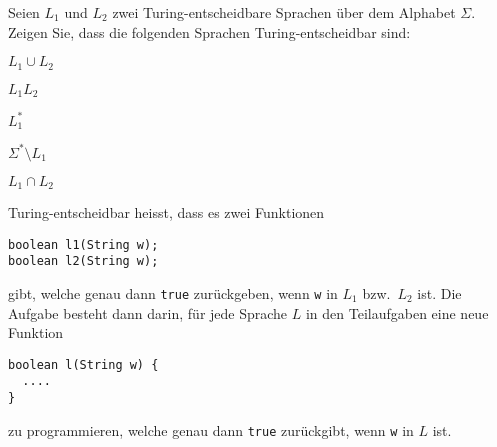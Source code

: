 Seien $L_1$ und $L_2$ zwei Turing-entscheidbare Sprachen über dem
Alphabet $\Sigma$.
Zeigen Sie, dass die folgenden Sprachen Turing-entscheidbar sind:
\begin{teilaufgaben}
\item $L_1\cup L_2$
\item $L_1L_2$
\item $L_1^*$
\item $\Sigma^*\setminus L_1$
\item $L_1\cap L_2$
\end{teilaufgaben}


\begin{hinweis}
Turing-entscheidbar heisst, dass es zwei Funktionen 
\begin{verbatim}
boolean l1(String w);
boolean l2(String w);
\end{verbatim}
gibt, welche genau dann \texttt{true} zurückgeben, wenn
\texttt{w} in $L_1$ bzw.~$L_2$ ist.
Die Aufgabe
besteht dann darin, für jede Sprache $L$ in den Teilaufgaben eine neue
Funktion
\begin{verbatim}
boolean l(String w) {
  ....
}
\end{verbatim}
zu programmieren, welche genau dann \texttt{true} zurückgibt, wenn
\texttt{w} in $L$ ist.
\end{hinweis}

